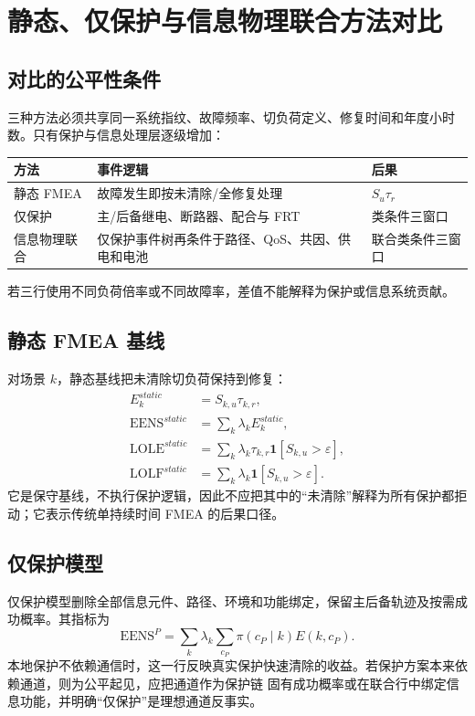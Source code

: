\section{静态、仅保护与信息物理联合方法对比}\label{sec:rel-method-comparison}

\subsection{对比的公平性条件}
三种方法必须共享同一系统指纹、故障频率、切负荷定义、修复时间和年度小时数。只有保护与信息处理层逐级增加：
\begin{longtable}{@{}L{3.0cm}L{5.0cm}L{5.8cm}@{}}
\toprule
方法 & 事件逻辑 & 后果\\
\midrule
静态 FMEA & 故障发生即按未清除/全修复处理 & $S_u\tau_r$\\
仅保护 & 主/后备继电、断路器、配合与 FRT & 类条件三窗口\\
信息物理联合 & 仅保护事件树再条件于路径、QoS、共因、供电和电池 & 联合类条件三窗口\\
\bottomrule
\end{longtable}
若三行使用不同负荷倍率或不同故障率，差值不能解释为保护或信息系统贡献。

\subsection{静态 FMEA 基线}
对场景 $k$，静态基线把未清除切负荷保持到修复：
\begin{align}
 E_k^{static}&=S_{k,u}\tau_{k,r},\\
 \mathrm{EENS}^{static}&=\sum_k\lambda_kE_k^{static},\\
 \mathrm{LOLE}^{static}&=\sum_k\lambda_k\tau_{k,r}\mathbf1[S_{k,u}>\varepsilon],\\
 \mathrm{LOLF}^{static}&=\sum_k\lambda_k\mathbf1[S_{k,u}>\varepsilon].
\end{align}
它是保守基线，不执行保护逻辑，因此不应把其中的“未清除”解释为所有保护都拒动；它表示传统单持续时间 FMEA 的后果口径。

\subsection{仅保护模型}
仅保护模型删除全部信息元件、路径、环境和功能绑定，保留主后备轨迹及按需成功概率。其指标为
\begin{equation}
 \mathrm{EENS}^{P}=\sum_k\lambda_k\sum_{c_P}\pi(c_P\mid k)E(k,c_P).
\end{equation}
本地保护不依赖通信时，这一行反映真实保护快速清除的收益。若保护方案本来依赖通道，则为公平起见，应把通道作为保护链
固有成功概率或在联合行中绑定信息功能，并明确“仅保护”是理想通道反事实。

